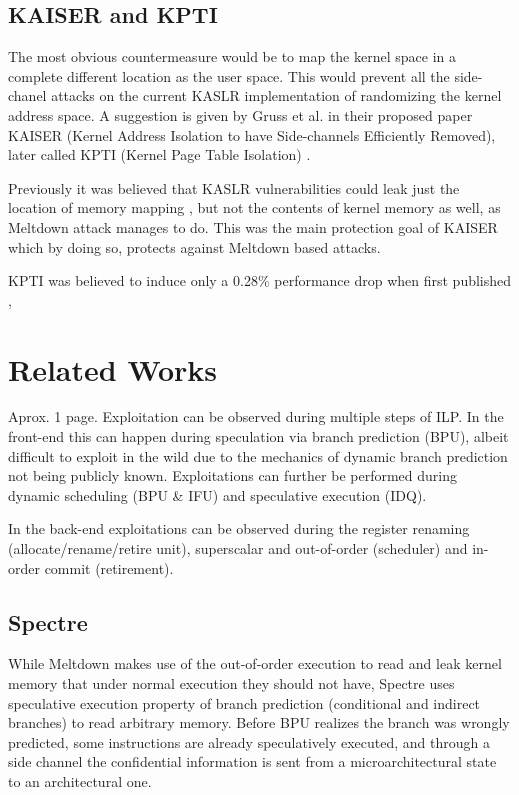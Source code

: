 \documentclass[sigconf]{acmart}
\begin{document}
\subsection{KAISER and KPTI}
The most obvious countermeasure would be to map the kernel space in a complete different location as the user space. This would prevent all the side-chanel attacks on the current KASLR implementation of randomizing the kernel address space. 
A suggestion is given by Gruss et al. in their proposed paper KAISER \cite{} (Kernel Address Isolation to have Side-channels Efficiently Removed), later called KPTI (Kernel Page Table Isolation) . 

Previously it was believed that KASLR vulnerabilities could leak just the location of memory mapping \cite{}, but not the contents of  kernel memory as well, as Meltdown attack manages to do. This was the main protection goal of KAISER  which by doing so, protects against Meltdown based attacks. 

KPTI was believed to induce only a 0.28\% performance drop when first published \cite{}, 


\section{Related Works}
Aprox. 1 page.
Exploitation can be observed during multiple steps of ILP. In the front-end this can happen during speculation via branch prediction (BPU), albeit difficult to exploit in the wild due to the mechanics of dynamic branch prediction not being publicly known. Exploitations can further be performed during dynamic scheduling (BPU \& IFU) and speculative execution (IDQ).

In the back-end exploitations can be observed during the register renaming (allocate/rename/retire unit), superscalar and out-of-order (scheduler) and in-order commit (retirement).

\subsection{Spectre}

While Meltdown makes use of the out-of-order execution to read and leak kernel memory that under normal execution they should not have, Spectre uses speculative execution property of branch prediction (conditional and indirect branches) to read arbitrary memory. Before BPU realizes the branch was wrongly predicted, some instructions are already speculatively executed, and through a side channel the confidential information is sent from a microarchitectural state to an architectural one. 
\end{document}
